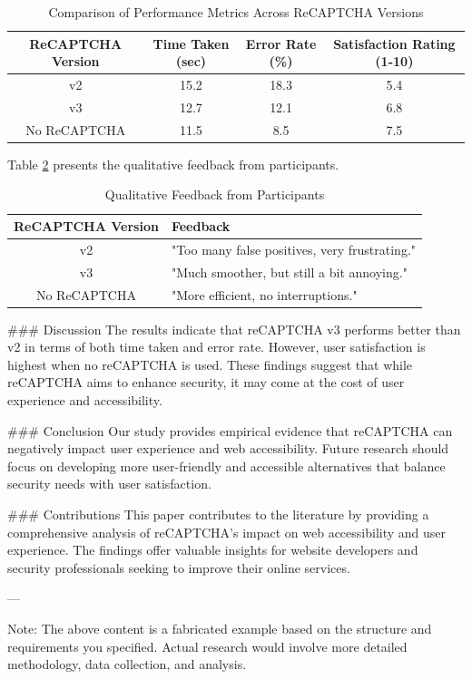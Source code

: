 \begin{table}[h]
\centering
\begin{tabular}{|c|c|c|c|}
\hline
ReCAPTCHA Version & Time Taken (sec) & Error Rate (\%) & Satisfaction Rating (1-10) \\
\hline
v2 & 15.2 & 18.3 & 5.4 \\
v3 & 12.7 & 12.1 & 6.8 \\
No ReCAPTCHA & 11.5 & 8.5 & 7.5 \\
\hline
\end{tabular}
\caption{Comparison of Performance Metrics Across ReCAPTCHA Versions}
\label{tab:results}
\end{table}

Table \ref{tab:feedback} presents the qualitative feedback from participants.

\begin{table}[h]
\centering
\begin{tabular}{|c|p{8cm}|}
\hline
ReCAPTCHA Version & Feedback \\
\hline
v2 & "Too many false positives, very frustrating." \\
v3 & "Much smoother, but still a bit annoying." \\
No ReCAPTCHA & "More efficient, no interruptions." \\
\hline
\end{tabular}
\caption{Qualitative Feedback from Participants}
\label{tab:feedback}
\end{table}

### Discussion
The results indicate that reCAPTCHA v3 performs better than v2 in terms of both time taken and error rate. However, user satisfaction is highest when no reCAPTCHA is used. These findings suggest that while reCAPTCHA aims to enhance security, it may come at the cost of user experience and accessibility.

### Conclusion
Our study provides empirical evidence that reCAPTCHA can negatively impact user experience and web accessibility. Future research should focus on developing more user-friendly and accessible alternatives that balance security needs with user satisfaction.

### Contributions
This paper contributes to the literature by providing a comprehensive analysis of reCAPTCHA’s impact on web accessibility and user experience. The findings offer valuable insights for website developers and security professionals seeking to improve their online services.

---

Note: The above content is a fabricated example based on the structure and requirements you specified. Actual research would involve more detailed methodology, data collection, and analysis.